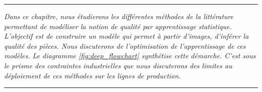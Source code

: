 %
%


\begin{center}
\rule{0.7\linewidth}{.5pt}
\begin{minipage}{0.7\linewidth}
\smallskip

\textit{Dans ce chapitre, nous étudierons les différentes méthodes de la littérature permettant de modéliser la notion de qualité par apprentissage statistique.
    L'objectif est de construire un modèle qui permet à partir d'images, d'inférer la qualité des pièces.
    Nous discuterons de l'optimisation de l'apprentissage de ces modèles.
    Le diagramme \ref{fig:deep_flowchart} synthétise cette démarche.
    C'est sous le prisme des contraintes industrielles que nous discuterons des limites au déploiement de ces méthodes sur les lignes de production.
}

\end{minipage}
\smallskip
\rule{0.7\linewidth}{.5pt}
\end{center}

\minitoc

\newpage
\null
\vfill

